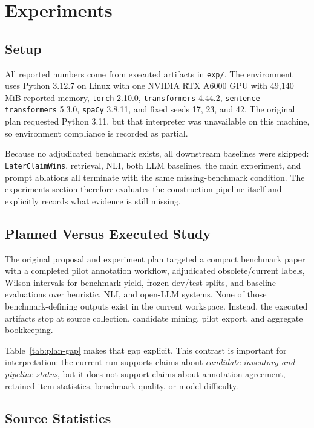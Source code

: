 \documentclass{article}
\begin{document}
\section{Experiments}
\label{sec:experiments}

\subsection{Setup}

All reported numbers come from executed artifacts in \texttt{exp/}. The environment uses Python 3.12.7 on Linux with one NVIDIA RTX A6000 GPU with 49{,}140 MiB reported memory, \texttt{torch} 2.10.0, \texttt{transformers} 4.44.2, \texttt{sentence-transformers} 5.3.0, \texttt{spaCy} 3.8.11, and fixed seeds 17, 23, and 42. The original plan requested Python 3.11, but that interpreter was unavailable on this machine, so environment compliance is recorded as partial.

Because no adjudicated benchmark exists, all downstream baselines were skipped: \texttt{LaterClaimWins}, retrieval, NLI, both LLM baselines, the main experiment, and prompt ablations all terminate with the same missing-benchmark condition. The experiments section therefore evaluates the construction pipeline itself and explicitly records what evidence is still missing.

\subsection{Planned Versus Executed Study}

The original proposal and experiment plan targeted a compact benchmark paper with a completed pilot annotation workflow, adjudicated obsolete/current labels, Wilson intervals for benchmark yield, frozen dev/test splits, and baseline evaluations over heuristic, NLI, and open-LLM systems. None of those benchmark-defining outputs exist in the current workspace. Instead, the executed artifacts stop at source collection, candidate mining, pilot export, and aggregate bookkeeping.

Table~\ref{tab:plan-gap} makes that gap explicit. This contrast is important for interpretation: the current run supports claims about \emph{candidate inventory and pipeline status}, but it does not support claims about annotation agreement, retained-item statistics, benchmark quality, or model difficulty.

\subsection{Source Statistics}
\end{document}

